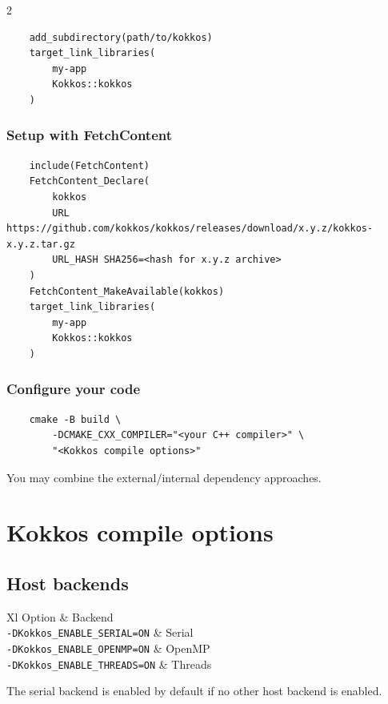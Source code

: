 \documentclass[
    kokkoshighlight,
]{./cheat_sheet_kokkos}
\begin{document}
\begin{multicols}{2}
\begin{verbatim}
    add_subdirectory(path/to/kokkos)
    target_link_libraries(
        my-app
        Kokkos::kokkos
    )
\end{verbatim}

\subsubsection{Setup with FetchContent}

\begin{verbatim}
    include(FetchContent)
    FetchContent_Declare(
        kokkos
        URL https://github.com/kokkos/kokkos/releases/download/x.y.z/kokkos-x.y.z.tar.gz
        URL_HASH SHA256=<hash for x.y.z archive>
    )
    FetchContent_MakeAvailable(kokkos)
    target_link_libraries(
        my-app
        Kokkos::kokkos
    )
\end{verbatim}

\subsubsection{Configure your code}

\begin{verbatim}
    cmake -B build \
        -DCMAKE_CXX_COMPILER="<your C++ compiler>" \
        "<Kokkos compile options>"
\end{verbatim}

You may combine the external/internal dependency approaches.

\section{Kokkos compile options}

\subsection{Host backends}

\begin{tblr}[theme=kokkostable]{Xl}
    Option & Backend \\
    \texttt{-DKokkos_ENABLE_SERIAL=ON} & Serial \\
    \texttt{-DKokkos_ENABLE_OPENMP=ON} & OpenMP \\
    \texttt{-DKokkos_ENABLE_THREADS=ON} & Threads \\
\end{tblr}

The serial backend is enabled by default if no other host backend is enabled.


\end{multicols}
\end{document}
